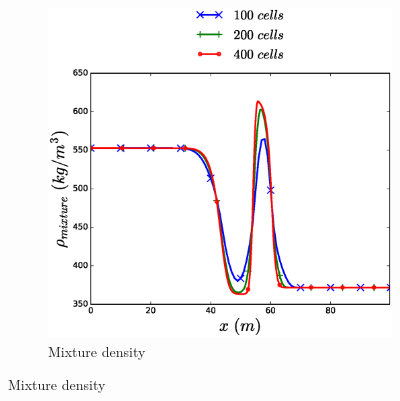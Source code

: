 \documentclass{inputs/mc2015}
\begin{document}
\begin{figure}[H]
\begin{subfigure}[b]{0.435\textwidth}
                \includegraphics[width=\textwidth]{figures/two-phase-shock-tube-hem-density-mixture-plot.eps}                
                \caption{Mixture density}
                \label{fig:2p-shock-tube-plots-rho-mix-hem-sa}
        \end{subfigure}%
        

\end{figure}
\end{document}

